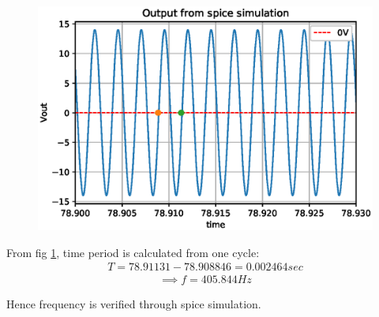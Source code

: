 \begin{enumerate}[label=\thesection.\arabic*.,ref=\thesection.\theenumi]
\begin{figure}[!ht]
\centering
\includegraphics[width=\columnwidth]{./figs/ee18btech11050/ee18btech11050_sim2.eps}
\caption{}
\label{fig:ee18btech11050_f7}
\end{figure}

From fig \ref{fig:ee18btech11050_f7}, time period is calculated from one cycle:
\begin{align}
    T = 78.91131 - 78.908846 = 0.002464 sec
\end{align}
\begin{align}
    \implies f = 405.844 Hz
\end{align}

Hence frequency is verified through spice simulation.

\end{enumerate}
